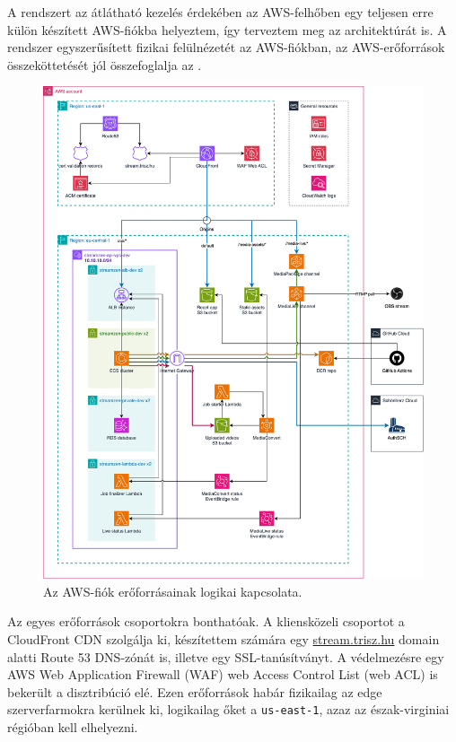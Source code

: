A rendszert az átlátható kezelés érdekében az AWS-felhőben egy teljesen erre külön készített AWS-fiókba helyeztem, így terveztem meg az architektúrát is. A rendszer egyszerűsített fizikai felülnézetét az AWS-fiókban, az AWS-erőforrások összeköttetését jól összefoglalja az .

\begin{figure}
	\centering
	\includegraphics[width=160mm, keepaspectratio]{figures/dipterv_architect.png}
	\caption{Az AWS-fiók erőforrásainak logikai kapcsolata.}
	\label{fig:architect}
\end{figure}

Az egyes erőforrások csoportokra bonthatóak. A kliensközeli csoportot a CloudFront CDN szolgálja ki, készítettem számára egy \url{stream.trisz.hu} domain alatti Route 53 DNS-zónát is, illetve egy SSL-tanúsítványt. A védelmezésre egy AWS Web Application Firewall (WAF) web Access Control List (web ACL) is bekerült a disztribúció elé. Ezen erőforrások habár fizikailag az edge szerverfarmokra kerülnek ki, logikailag őket a \verb|us-east-1|, azaz az észak-virginiai régióban kell elhelyezni.

